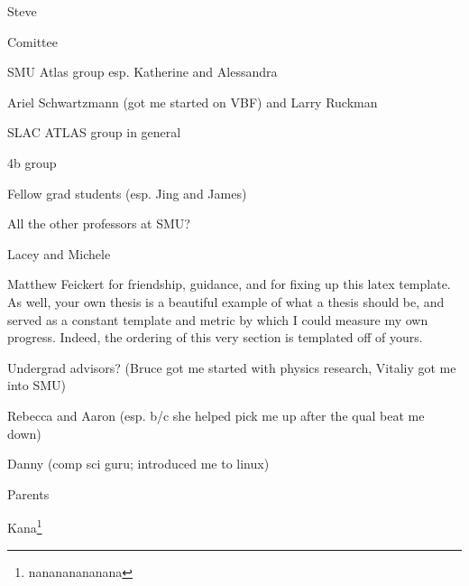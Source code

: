 Steve

Comittee

SMU Atlas group
esp. Katherine and Alessandra

Ariel Schwartzmann (got me started on VBF) and Larry Ruckman

SLAC ATLAS group in general

4b group



Fellow grad students (esp. Jing and James)

All the other professors at SMU?

Lacey and Michele

Matthew Feickert for friendship, guidance, and for fixing up this latex template.
As well, your own thesis\cite{matthew_feickert} is a beautiful example of what a thesis should be,
    and served as a constant template and metric by which I could measure my own progress.
Indeed, the ordering of this very section is templated off of yours.



Undergrad advisors? (Bruce got me started with physics research, Vitaliy got me into SMU)

Rebecca and Aaron (esp. b/c she helped pick me up after the qual beat me down)

Danny (comp sci guru; introduced me to linux)



Parents

Kana\footnote{nanananananana}
